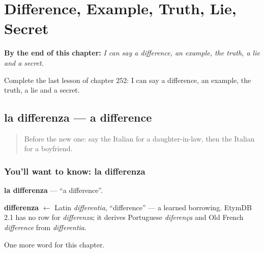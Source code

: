 
\chapter{Difference, Example, Truth, Lie, Secret}
\label{ch:it-difference-example-truth-lie-secret}

\begin{chapteropening}
\textbf{By the end of this chapter:} \emph{I can say a difference, an example, the truth, a lie and a secret.}

Complete the last lesson of chapter 252: I can say a difference, an example, the truth, a lie and a secret.
\end{chapteropening}

\section[la differenza]{la differenza — a difference}

\label{lesson:IT-C252-differenza}



\begin{quote}
Before the new one: say the Italian for a daughter-in-law, then the Italian for a boyfriend.
\end{quote}

\subsection*{You'll want to know: la differenza}
\textbf{la differenza} — \textquotedblleft{}a difference\textquotedblright{}.

\begin{cousinweb}
\textbf{differenza} $\leftarrow$ Latin \emph{differentia}, \textquotedblleft{}difference\textquotedblright{} — a learned borrowing. EtymDB 2.1 has no row for \emph{differenza}; it derives Portuguese \emph{diferença} and Old French \emph{difference} from \emph{differentia}.
\end{cousinweb}

\begin{grammarlens}[title={What you've built}]
One more word for this chapter.
\end{grammarlens}

